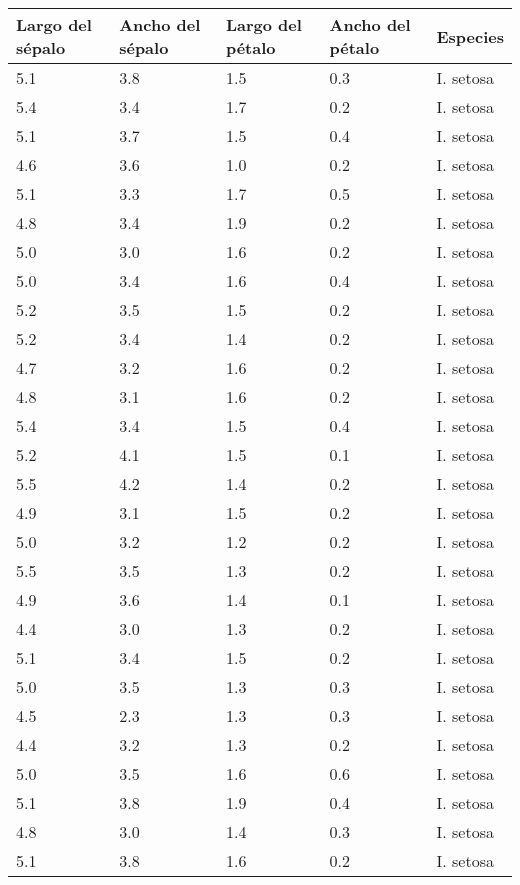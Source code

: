 \begin{appendices}
\begin{center}
\begin{tabular}{|p{2cm}|p{2cm}|p{2cm}|p{2cm}|p{2cm}|}
\hline
Largo del sépalo & Ancho del sépalo & Largo del pétalo & Ancho del pétalo & Especies \\
\hline
5.1	& 3.8 & 1.5	& 0.3 & I. setosa\\
\hline
5.4	& 3.4 & 1.7	& 0.2 & I. setosa\\
\hline
5.1	& 3.7 & 1.5	& 0.4 & I. setosa\\
\hline
4.6	& 3.6 & 1.0	& 0.2 & I. setosa\\
\hline
5.1	& 3.3 & 1.7	& 0.5 & I. setosa\\
\hline
4.8	& 3.4 & 1.9	& 0.2 & I. setosa\\
\hline
5.0	& 3.0 & 1.6	& 0.2 & I. setosa\\
\hline
5.0	& 3.4 & 1.6	& 0.4 & I. setosa\\
\hline
5.2	& 3.5 & 1.5	& 0.2 & I. setosa\\
\hline
5.2	& 3.4 & 1.4	& 0.2 & I. setosa\\
\hline
4.7	& 3.2 & 1.6	& 0.2 & I. setosa\\
\hline
4.8	& 3.1 & 1.6	& 0.2 & I. setosa\\
\hline
5.4	& 3.4 & 1.5	& 0.4 & I. setosa\\
\hline
5.2	& 4.1 & 1.5	& 0.1 & I. setosa\\
\hline
5.5	& 4.2 & 1.4	& 0.2 & I. setosa\\
\hline
4.9	& 3.1 & 1.5	& 0.2 & I. setosa\\
\hline
5.0	& 3.2 & 1.2	& 0.2 & I. setosa\\
\hline
5.5	& 3.5 & 1.3	& 0.2 & I. setosa\\
\hline
4.9	& 3.6 & 1.4	& 0.1 & I. setosa\\
\hline
4.4	& 3.0 & 1.3	& 0.2 & I. setosa\\
\hline
5.1	& 3.4 & 1.5	& 0.2 & I. setosa\\
\hline
5.0	& 3.5 & 1.3	& 0.3 & I. setosa\\
\hline
4.5	& 2.3 & 1.3	& 0.3 & I. setosa\\
\hline
4.4	& 3.2 & 1.3	& 0.2 & I. setosa\\
\hline
5.0	& 3.5 & 1.6	& 0.6 & I. setosa\\
\hline
5.1	& 3.8 & 1.9	& 0.4 & I. setosa\\
\hline
4.8	& 3.0 & 1.4	& 0.3 & I. setosa\\
\hline
5.1	& 3.8 & 1.6	& 0.2 & I. setosa\\

\end{tabular}
\end{center}
\end{appendices}
